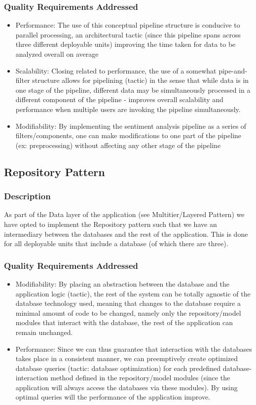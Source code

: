 \documentclass[12pt]{article}
\begin{document}
\subsubsection{Quality Requirements Addressed}
\begin{itemize}
    \item Performance: The use of this conceptual pipeline structure is conducive to parallel processing, an architectural tactic (since this pipeline spans across three different deployable units) improving the time taken for data to be analyzed overall on average
    \item Scalability: Closing related to performance, the use of a somewhat pipe-and-filter structure allows for pipelining (tactic) in the sense that while data is in one stage of the pipeline, different data may be simultaneously processed in a different component of the pipeline - improves overall scalability and performance when multiple users are invoking the pipeline simultaneously.
    \item Modifiability: By implementing the sentiment analysis pipeline as a series of filters/components, one can make modifications to one part of the pipeline (ex: preprocessing) without affecting any other stage of the pipeline
\end{itemize}
\subsection{Repository Pattern}
\subsubsection{Description}
As part of the Data layer of the application (see Multitier/Layered Pattern) we have opted to implement the Repository pattern such that we have an intermediary between the databases and the rest of the application. This is done for all deployable units that include a database (of which there are three).
\subsubsection{Quality Requirements Addressed}
\begin{itemize}
    \item Modifiability: By placing an abstraction between the database and the application logic (tactic), the rest of the system can be totally agnostic of the database technology used, meaning that changes to the database require a minimal amount of code to be changed, namely only the repository/model modules that interact with the database, the rest of the application can remain unchanged.
    \item Performance: Since we can thus guarantee that interaction with the databases takes place in a consistent manner, we can preemptively create optimized database queries (tactic: database optimization) for each predefined database-interaction method defined in the repository/model modules (since the application will always access the databases via these modules). By using optimal queries will the performance of the application improve.
\end{itemize}
\end{document}
